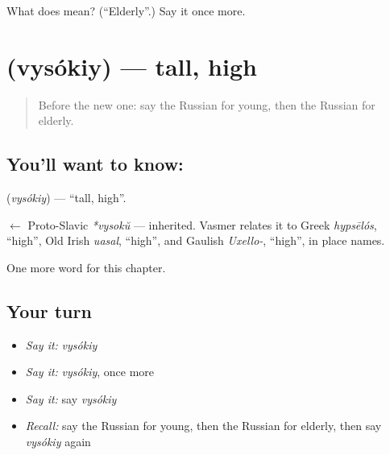 \begin{tcolorbox}[breakable,colback=teal!4,colframe=teal!35!black,title={Before you move on}]
What does  mean? (\textquotedblleft{}Elderly\textquotedblright{}.) Say it once more.
\end{tcolorbox}
\section[\texorpdfstring{\ru{высокий} (vysókiy)}{высокий (vysókiy)}]{ (vysókiy) — tall, high}

\label{lesson:RU-C243-vysokiy}



\begin{quote}
Before the new one: say the Russian for young, then the Russian for elderly.
\end{quote}

\subsection*{You'll want to know: }
\textbf{} (\emph{vysókiy}) — \textquotedblleft{}tall, high\textquotedblright{}.

\begin{cousinweb}
\textbf{} $\leftarrow$ Proto-Slavic \emph{*vysokŭ} — inherited. Vasmer relates it to Greek \emph{hypsēlós}, \textquotedblleft{}high\textquotedblright{}, Old Irish \emph{uasal}, \textquotedblleft{}high\textquotedblright{}, and Gaulish \emph{Uxello-}, \textquotedblleft{}high\textquotedblright{}, in place names.
\end{cousinweb}

\begin{grammarlens}[title={What you've built}]
One more word for this chapter.
\end{grammarlens}

\subsection*{Your turn}
\begin{itemize}
\raggedright
  \item \emph{Say it:} \emph{vysókiy}
  \item \emph{Say it:} \emph{vysókiy}, once more
  \item \emph{Say it:} say \emph{vysókiy}
  \item \emph{Recall:} say the Russian for young, then the Russian for elderly, then say \emph{vysókiy} again
\end{itemize}

